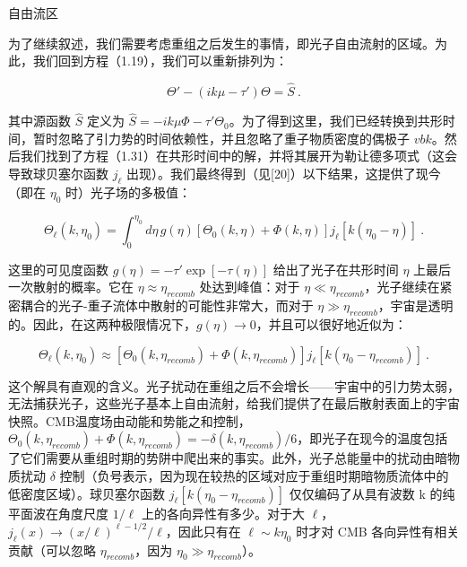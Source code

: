 自由流区

为了继续叙述，我们需要考虑重组之后发生的事情，即光子自由流射的区域。为此，我们回到方程（1.19），我们可以重新排列为：

\[ \Theta' - (ik\mu - \tau')\Theta = \hat{S} ~. \]

其中源函数 \( \hat{S} \) 定义为 \( \hat{S} = -ik\mu\Phi - \tau'\Theta_0 \)。为了得到这里，我们已经转换到共形时间，暂时忽略了引力势的时间依赖性，并且忽略了重子物质密度的偶极子 \( vbk \)。然后我们找到了方程（1.31）在共形时间中的解，并将其展开为勒让德多项式（这会导致球贝塞尔函数 \( j_\ell \) 出现）。我们最终得到（见[20]）以下结果，这提供了现今（即在 \( \eta_0 \) 时）光子场的多极值：

\[ \Theta_\ell(k, \eta_0) = \int_0^{\eta_0} d\eta \, g(\eta) \left[ \Theta_0(k, \eta) + \Phi(k, \eta) \right] j_\ell[k(\eta_0 - \eta)] ~. \]

这里的可见度函数 \( g(\eta) = -\tau' \exp[-\tau(\eta)] \) 给出了光子在共形时间 \( \eta \) 上最后一次散射的概率。它在 \( \eta \approx \eta_{recomb} \) 处达到峰值：对于 \( \eta \ll \eta_{recomb} \)，光子继续在紧密耦合的光子-重子流体中散射的可能性非常大，而对于 \( \eta \gg \eta_{recomb} \)，宇宙是透明的。因此，在这两种极限情况下，\( g(\eta) \to 0 \)，并且可以很好地近似为：

\[ \Theta_\ell(k, \eta_0) \approx \left[ \Theta_0(k, \eta_{recomb}) + \Phi(k, \eta_{recomb}) \right] j_\ell[k(\eta_0 - \eta_{recomb})] ~. \]

这个解具有直观的含义。光子扰动在重组之后不会增长——宇宙中的引力势太弱，无法捕获光子，这些光子基本上自由流射，给我们提供了在最后散射表面上的宇宙快照。CMB温度场由动能和势能之和控制，\( \Theta_0(k, \eta_{recomb}) + \Phi(k, \eta_{recomb}) = -\delta(k, \eta_{recomb})/6 \)，即光子在现今的温度包括了它们需要从重组时期的势阱中爬出来的事实。此外，光子总能量中的扰动由暗物质扰动 \( \delta \) 控制（负号表示，因为现在较热的区域对应于重组时期暗物质流体中的低密度区域）。球贝塞尔函数 \( j_\ell[k(\eta_0 - \eta_{recomb})] \) 仅仅编码了从具有波数 k 的纯平面波在角度尺度 \( 1/\ell \) 上的各向异性有多少。对于大 \( \ell \)，\( j_\ell(x) \to (x/\ell)^{\ell-1/2}/\ell \)，因此只有在 \( \ell \sim k\eta_0 \) 时才对 CMB 各向异性有相关贡献（可以忽略 \( \eta_{recomb} \)，因为 \( \eta_0 \gg \eta_{recomb} \)）。



